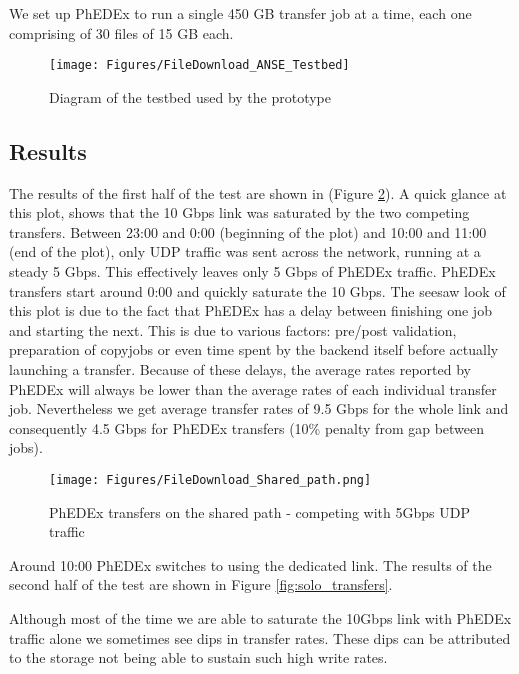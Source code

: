 We set up PhEDEx to run a single 450 GB transfer job at a time, each one 
comprising of 30 files of 15 GB each. 

\begin{figure}[h]
  \centering
  \texttt{[image: Figures/FileDownload\_ANSE\_Testbed]}
  \caption{Diagram of the testbed used by the prototype}
  \label{fig:testbed}
\end{figure} 


\subsection{Results}

The results of the first half of the test are shown in  (Figure \ref{fig:shared_transfers}).
A quick glance at this plot, shows that the 10 Gbps link was saturated by the two
competing transfers. Between 23:00 and 0:00 (beginning of the plot) and 
10:00 and 11:00 (end of the plot), only UDP traffic was sent across the network, 
running at a steady 5 Gbps. This effectively leaves only 5 Gbps of PhEDEx traffic.
PhEDEx transfers start around 0:00 and quickly saturate the 10 Gbps. 
The seesaw look of this plot is due to the fact that PhEDEx has a delay
between finishing one job and starting the next. This is due to various factors:
 pre/post validation, preparation of copyjobs or even time spent by the backend itself 
 before actually launching a transfer. Because of these delays, the average 
 rates reported by PhEDEx will always be lower than the average rates of each
 individual transfer job. Nevertheless we get average transfer rates of 9.5 Gbps for the
 whole link and consequently 4.5 Gbps for PhEDEx transfers (10\% penalty from
 gap between jobs).

\begin{figure}[h]
  \centering
  \texttt{[image: Figures/FileDownload\_Shared\_path.png]}
  \caption{PhEDEx transfers on the shared path - competing with 5Gbps UDP traffic}
  \label{fig:shared_transfers}
\end{figure} 

Around 10:00 PhEDEx switches to using the dedicated link. The results of the 
second half of the test are shown in Figure \ref{fig:solo_transfers}.

Although most of the time we are able to saturate the 10Gbps link with PhEDEx 
traffic alone we sometimes see dips in transfer rates. These dips can be attributed 
to the storage not being able to sustain such high write rates.

